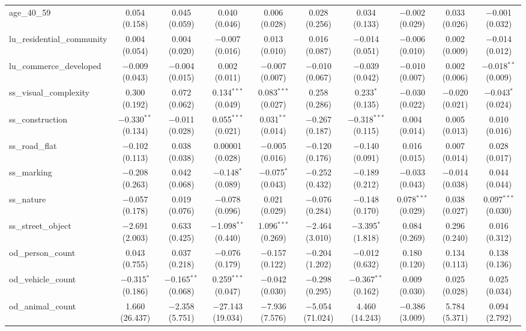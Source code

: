 \begin{table}[!htbp]
\begin{tabular}{@{\extracolsep{1pt}}lccccccccc}
  age\_40\_59 & 0.054 (0.158) & 0.045 (0.059) & 0.040 (0.046) & 0.006 (0.028) & 0.028 (0.256) & 0.034 (0.133) & $-$0.002 (0.029) & 0.033 (0.026) & $-$0.001 (0.032) \\ 
  lu\_residential\_community & 0.004 (0.054) & 0.004 (0.020) & $-$0.007 (0.016) & 0.013 (0.010) & 0.016 (0.087) & $-$0.014 (0.051) & $-$0.006 (0.010) & 0.002 (0.009) & $-$0.014 (0.012) \\ 
  lu\_commerce\_developed & $-$0.009 (0.043) & $-$0.004 (0.015) & 0.002 (0.011) & $-$0.007 (0.007) & $-$0.010 (0.067) & $-$0.039 (0.042) & $-$0.010 (0.007) & 0.002 (0.006) & $-$0.018$^{**}$ (0.009) \\ 
  ss\_visual\_complexity & 0.300 (0.192) & 0.072 (0.062) & 0.134$^{***}$ (0.049) & 0.083$^{***}$ (0.027) & 0.258 (0.286) & 0.233$^{*}$ (0.135) & $-$0.030 (0.022) & $-$0.020 (0.021) & $-$0.043$^{*}$ (0.024) \\ 
  ss\_construction & $-$0.330$^{**}$ (0.134) & $-$0.011 (0.028) & 0.055$^{***}$ (0.021) & 0.031$^{**}$ (0.014) & $-$0.267 (0.187) & $-$0.318$^{***}$ (0.115) & 0.004 (0.014) & 0.005 (0.013) & 0.010 (0.016) \\ 
  ss\_road\_flat & $-$0.102 (0.113) & 0.038 (0.038) & 0.00001 (0.028) & $-$0.005 (0.016) & $-$0.120 (0.176) & $-$0.140 (0.091) & 0.016 (0.015) & 0.007 (0.014) & 0.028 (0.017) \\ 
  ss\_marking & $-$0.208 (0.263) & 0.042 (0.068) & $-$0.148$^{*}$ (0.089) & $-$0.075$^{*}$ (0.043) & $-$0.252 (0.432) & $-$0.189 (0.212) & $-$0.033 (0.043) & $-$0.014 (0.038) & 0.044 (0.044) \\ 
  ss\_nature & $-$0.057 (0.178) & 0.019 (0.076) & $-$0.078 (0.096) & 0.021 (0.029) & $-$0.076 (0.284) & $-$0.148 (0.170) & 0.078$^{***}$ (0.029) & 0.038 (0.027) & 0.097$^{***}$ (0.030) \\ 
  ss\_street\_object & $-$2.691 (2.003) & 0.633 (0.425) & $-$1.098$^{**}$ (0.440) & 1.096$^{***}$ (0.269) & $-$2.464 (3.010) & $-$3.395$^{*}$ (1.818) & 0.084 (0.269) & 0.296 (0.240) & 0.016 (0.312) \\ 
  od\_person\_count & 0.043 (0.755) & 0.037 (0.218) & $-$0.076 (0.179) & $-$0.157 (0.122) & $-$0.204 (1.202) & $-$0.012 (0.632) & 0.180 (0.120) & 0.134 (0.113) & 0.138 (0.136) \\ 
  od\_vehicle\_count & $-$0.315$^{*}$ (0.186) & $-$0.165$^{**}$ (0.068) & 0.259$^{***}$ (0.047) & $-$0.042 (0.030) & $-$0.298 (0.295) & $-$0.367$^{**}$ (0.162) & 0.009 (0.030) & 0.025 (0.028) & 0.025 (0.034) \\ 
  od\_animal\_count & 1.660 (26.437) & $-$2.358 (5.751) & $-$27.143 (19.034) & $-$7.936 (7.576) & $-$5.054 (71.024) & 4.460 (14.243) & $-$0.386 (3.009) & 5.784 (5.371) & 0.094 (2.792) \\ 

\end{tabular}
\end{table}
